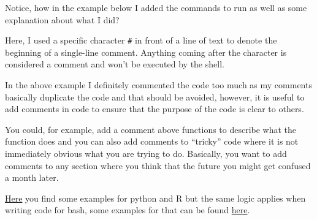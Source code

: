 \documentclass[
  letterpaper,
  DIV=11,
  numbers=noendperiod]{scrreprt}
\begin{document}
\begin{tcolorbox}[enhanced jigsaw, colframe=quarto-callout-tip-color-frame, colbacktitle=quarto-callout-tip-color!10!white, opacitybacktitle=0.6, breakable, titlerule=0mm, colback=white, toptitle=1mm, leftrule=.75mm, opacityback=0, coltitle=black, left=2mm, toprule=.15mm, bottomtitle=1mm, rightrule=.15mm, title=\textcolor{quarto-callout-tip-color}{\faLightbulb}\hspace{0.5em}{Tip: commenting your code}, bottomrule=.15mm, arc=.35mm]

Notice, how in the example below I added the commands to run as well as
some explanation about what I did?

Here, I used a specific character \texttt{\#} in front of a line of text
to denote the beginning of a single-line comment. Anything coming after
the character is considered a comment and won't be executed by the
shell.

In the above example I definitely commented the code too much as my
comments basically duplicate the code and that should be avoided,
however, it is useful to add comments in code to ensure that the purpose
of the code is clear to others.

You could, for example, add a comment above functions to describe what
the function does and you can also add comments to ``tricky'' code where
it is not immediately obvious what you are trying to do. Basically, you
want to add comments to any section where you think that the future you
might get confused a month later.

\href{https://best-practice-and-impact.github.io/qa-of-code-guidance/code_documentation.html}{Here}
you find some examples for python and R but the same logic applies when
writing code for bash, some examples for that can be found
\href{https://linuxize.com/post/bash-comments/}{here}.

\end{tcolorbox}
\end{document}
